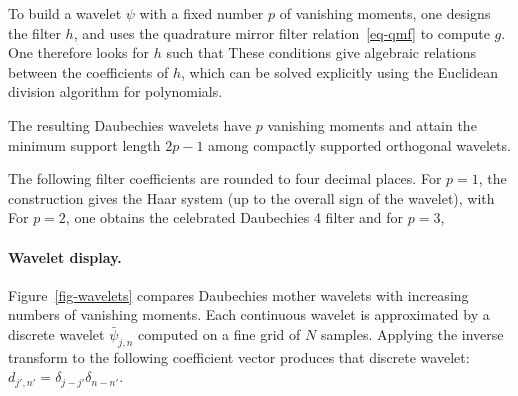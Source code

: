 To build a wavelet $\psi$ with a fixed number $p$ of vanishing moments, one designs the filter $h$, and uses the quadrature mirror filter relation~\eqref{eq-qmf} to compute $g$. One therefore looks for $h$ such that
These conditions give algebraic relations between the coefficients of $h$, which can be solved explicitly using the Euclidean division algorithm for polynomials.

The resulting Daubechies wavelets have $p$ vanishing moments and attain the minimum support length $2p-1$ among compactly supported orthogonal wavelets.

The following filter coefficients are rounded to four decimal places. For $p=1$, the construction gives the Haar system (up to the overall sign of the wavelet), with
For $p=2$, one obtains the celebrated Daubechies 4 filter 
and for $p=3$,

\paragraph{Wavelet display.}

Figure~\ref{fig-wavelets} compares Daubechies mother wavelets with increasing numbers of vanishing moments. Each continuous wavelet is approximated by a discrete wavelet $\bar \psi_{j,n}$ computed on a fine grid of $N$ samples. Applying the inverse transform to the following coefficient vector produces that discrete wavelet:
$d_{j',n'} = \delta_{j-j'} \delta_{n-n'}$.

